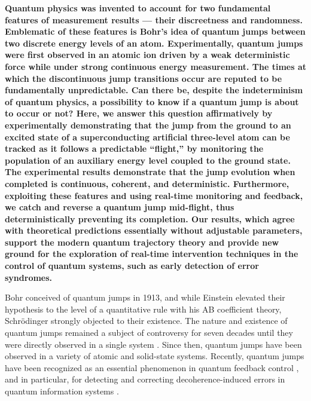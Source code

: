 \documentclass[
	 			preprint,     		superscriptaddress, 																longbibliography,
		amsmath, amssymb,
		aps,  prb,   		floatfix,
		linenumbers     
	]{revtex4-1}
\begin{document}
\onecolumngrid
\textbf{ 
Quantum physics was invented to account for  
 two fundamental features of measurement results — their discreetness and  randomness. Emblematic of these features is Bohr’s idea of quantum jumps between two discrete energy levels of an atom\cite{Bohr1913}. Experimentally, quantum jumps were first observed in an  atomic ion driven by a weak deterministic force while under strong continuous energy measurement\cite{Nagourney1986, Sauter1986, Bergquist1986}. The times at which the discontinuous jump transitions occur are reputed to be fundamentally unpredictable. 
Can there be, despite the indeterminism of quantum physics, a possibility to know if a quantum jump is about to occur or not?
Here, we answer this question affirmatively by experimentally demonstrating that the  jump from the ground to an excited state of a superconducting artificial three-level atom can be tracked as it follows a predictable ``flight,'' 
by monitoring the population of an auxiliary energy level coupled to the ground state.  The experimental results demonstrate that the jump evolution when completed is continuous, coherent, and deterministic. Furthermore, exploiting these features and using real-time monitoring and feedback, we catch and reverse a quantum jump mid-flight, thus deterministically preventing its completion. 
Our results, which agree with theoretical predictions essentially without adjustable parameters,  support the modern quantum trajectory theory\cite{Carmichael1993, Gardiner1992-original-traj, Dalibard1992-original-traj, Plenio1998, Korotkov1999-original-traj} and  provide new ground for the exploration of real-time intervention techniques in the control of quantum systems, such as early detection of error syndromes.
}
\vspace{1em}
\twocolumngrid






Bohr conceived of quantum jumps \cite{Bohr1913} in 1913, and while Einstein elevated their hypothesis to the level of a quantitative rule with his AB coefficient theory\cite{Einstein1916, Einstein1917}, Schr\"{o}dinger strongly objected to their existence\cite{Schrodinger1952}. The nature and existence of quantum jumps remained a subject of controversy for seven decades until they were directly observed in a single system \cite{Nagourney1986, Sauter1986, Bergquist1986}. 
Since then, quantum jumps have been observed in a variety of  atomic\cite{Basche1995, Peil1999, Gleyzes2007, Guerlin2007} and solid-state \cite{Jelezko2002, Neumann2010, Robledo2011, Vijay2011, Hatridge2013} systems.  
Recently,  quantum jumps have been recognized as an essential phenomenon in quantum feedback  control \cite{Deleglise2008, Sayrin2001}, and in particular, for detecting and correcting decoherence-induced errors in quantum information systems \cite{Sun2013, Ofek2016}. 
\end{document}
